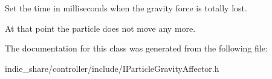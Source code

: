 Set the time in milliseconds when the gravity force is totally lost. 

At that point the particle does not move any more. 

The documentation for this class was generated from the following file\+:\begin{DoxyCompactItemize}
\item 
indie\+\_\+share/controller/include/I\+Particle\+Gravity\+Affector.\+h\end{DoxyCompactItemize}
